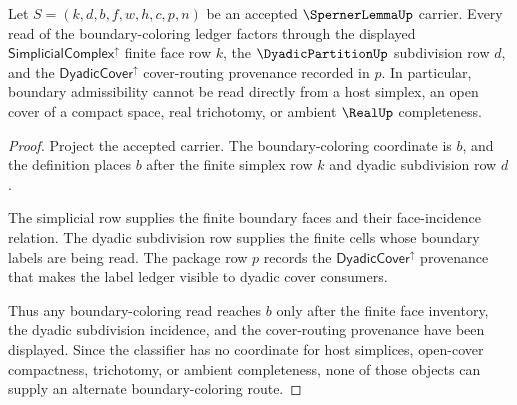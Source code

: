 \begin{theorem}
\label{thm:sperner-lemma-boundary-coloring-route}
Let $S=(k,d,b,f,w,h,c,p,n)$ be an accepted $\SpernerLemmaUp$ carrier. Every read of the boundary-coloring ledger factors through the displayed $\mathsf{SimplicialComplex}^{\uparrow}$ finite face row $k$, the $\DyadicPartitionUp$ subdivision row $d$, and the $\mathsf{DyadicCover}^{\uparrow}$ cover-routing provenance recorded in $p$. In particular, boundary admissibility cannot be read directly from a host simplex, an open cover of a compact space, real trichotomy, or ambient $\RealUp$ completeness.
\end{theorem}
\begin{proof}
Project the accepted carrier. The boundary-coloring coordinate is $b$, and the definition places $b$ after the finite simplex row $k$ and dyadic subdivision row $d$.

The simplicial row supplies the finite boundary faces and their face-incidence relation. The dyadic subdivision row supplies the finite cells whose boundary labels are being read. The package row $p$ records the $\mathsf{DyadicCover}^{\uparrow}$ provenance that makes the label ledger visible to dyadic cover consumers.

Thus any boundary-coloring read reaches $b$ only after the finite face inventory, the dyadic subdivision incidence, and the cover-routing provenance have been displayed. Since the classifier has no coordinate for host simplices, open-cover compactness, trichotomy, or ambient completeness, none of those objects can supply an alternate boundary-coloring route.
\end{proof}

